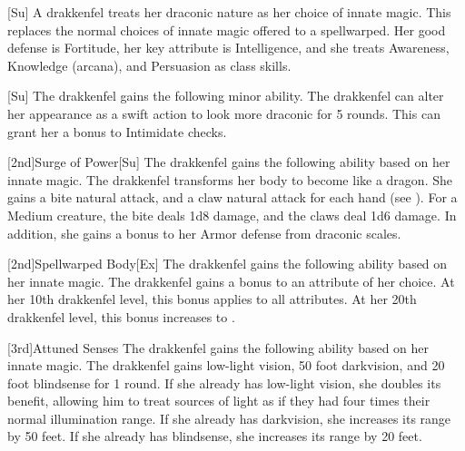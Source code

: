 [Su]
A drakkenfel treats her draconic nature as her choice of innate magic.
This replaces the normal choices of innate magic offered to a spellwarped.
Her good defense is Fortitude, her key attribute is Intelligence, and she treats Awareness, Knowledge (arcana), and Persuasion as class skills.

[Su]
The drakkenfel gains the following minor ability.
The drakkenfel can alter her appearance as a swift action to look more draconic for 5 rounds.
This can grant her a  bonus to Intimidate checks.

[2nd]{Surge of Power}[Su]
The drakkenfel gains the following ability based on her innate magic.
The drakkenfel transforms her body to become like a dragon.
She gains a bite natural attack, and a claw natural attack for each hand (see ).
For a Medium creature, the bite deals 1d8 damage, and the claws deal 1d6 damage.
In addition, she gains a  bonus to her Armor defense from draconic scales.

[2nd]{Spellwarped Body}[Ex]
The drakkenfel gains the following ability based on her innate magic.
The drakkenfel gains a  bonus to an attribute of her choice.
At her 10th drakkenfel level, this bonus applies to all attributes.
At her 20th drakkenfel level, this bonus increases to .

[3rd]{Attuned Senses}
The drakkenfel gains the following ability based on her innate magic.
The drakkenfel gains low-light vision, 50 foot darkvision, and 20 foot blindsense for 1 round.
If she already has low-light vision, she doubles its benefit, allowing him to treat sources of light as if they had four times their normal illumination range.
If she already has darkvision, she increases its range by 50 feet.
If she already has blindsense, she increases its range by 20 feet.

